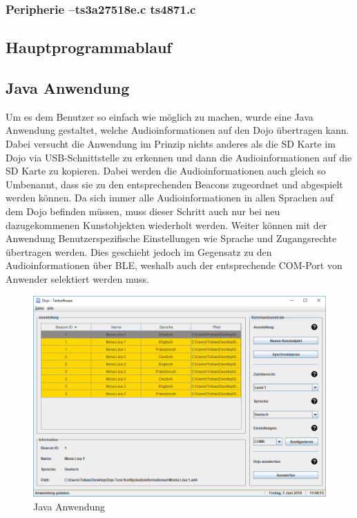 \subsubsection{Peripherie --ts3a27518e.c ts4871.c}

\subsection{Hauptprogrammablauf}


\subsection{Java Anwendung}

Um es dem Benutzer so einfach wie möglich zu machen, wurde eine Java Anwendung gestaltet, welche Audioinformationen auf den Dojo übertragen kann. Dabei versucht die Anwendung im Prinzip nichts anderes als die SD Karte im Dojo via USB-Schnittstelle zu erkennen und dann die Audioinformationen auf die SD Karte zu kopieren. Dabei werden die Audioinformationen auch gleich so Umbenannt, dass sie zu den entsprechenden Beacons zugeordnet und abgespielt werden können. Da sich immer alle Audioinformationen in allen Sprachen auf dem Dojo befinden müssen, muss dieser Schritt auch nur bei neu dazugekommenen Kunstobjekten wiederholt werden. Weiter können mit der Anwendung Benutzerspezifische Einstellungen wie Sprache und Zugangsrechte übertragen werden. Dies geschieht jedoch im Gegensatz zu den Audioinformationen über BLE, weshalb auch der entsprechende COM-Port von Anwender selektiert werden muss.

\begin{figure}[htb]
	\centering
	\includegraphics[width=\textwidth]{graphics/Java_Anwendung.png}
	\caption{Java Anwendung}
	\label{fig:Java Anwendung}
\end{figure}

